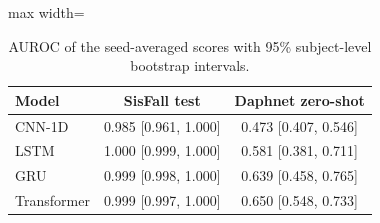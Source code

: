 \begin{table}[ht]
\centering
\small
\caption{AUROC of the seed-averaged scores with 95\% subject-level bootstrap intervals.}
\label{tab:ci}
\begin{adjustbox}{max width=\textwidth}
\begin{tabular}{lcc}
\toprule
Model & SisFall test & Daphnet zero-shot \\
\midrule
CNN-1D & 0.985 [0.961, 1.000] & 0.473 [0.407, 0.546] \\
LSTM & 1.000 [0.999, 1.000] & 0.581 [0.381, 0.711] \\
GRU & 0.999 [0.998, 1.000] & 0.639 [0.458, 0.765] \\
Transformer & 0.999 [0.997, 1.000] & 0.650 [0.548, 0.733] \\
\bottomrule
\end{tabular}
\end{adjustbox}
\end{table}